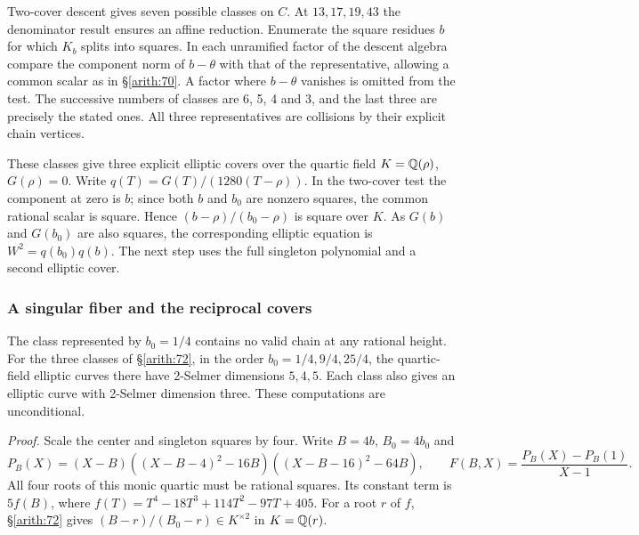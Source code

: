 Two-cover descent gives seven possible classes on \(C\). At
\(13,17,19,43\) the denominator result ensures an affine reduction.
Enumerate the square residues \(b\) for which \(K_b\) splits into
squares. In each unramified factor of the descent algebra compare
the component norm of \(b-\theta\) with that of the representative,
allowing a common scalar as in \S\ref{arith:70}. A factor where \(b-\theta\)
vanishes is omitted from the test. The successive numbers of classes
are 6, 5, 4 and 3, and the last three are precisely the stated ones.
All three representatives are collisions by their explicit chain
vertices.

These classes give three explicit elliptic covers over the quartic
field \(K=\mathbb Q(\rho)\), \(G(\rho)=0\). Write
\(q(T)=G(T)/(1280(T-\rho))\). In the two-cover test the component at
zero is \(b\); since both \(b\) and \(b_0\) are nonzero squares, the
common rational scalar is square. Hence \((b-\rho)/(b_0-\rho)\)
is square over \(K\). As \(G(b)\) and \(G(b_0)\) are also squares,
the corresponding elliptic equation is \(W^2=q(b_0)q(b)\).
The next step uses the full singleton polynomial
and a second elliptic cover.

\subsubsection{A singular fiber and the reciprocal covers}\label{arith:73}

The class represented by \(b_0=1/4\) contains no
valid chain at any rational height. For the three classes of \S\ref{arith:72},
in the order \(b_0=1/4,9/4,25/4\), the quartic-field elliptic curves
there have 2-Selmer dimensions \(5,4,5\). Each class also gives an
elliptic curve with 2-Selmer dimension three. These computations are
unconditional.

\emph{Proof.} Scale the center and singleton squares by four. Write
\(B=4b\), \(B_0=4b_0\) and
\[P_B(X)=(X-B)((X-B-4)^2-16B)((X-B-16)^2-64B),\qquad
 F(B,X)=\frac{P_B(X)-P_B(1)}{X-1}.\]
All four roots of this monic quartic must be rational squares. Its
constant term is \(5f(B)\), where
\(f(T)=T^4-18T^3+114T^2-97T+405\). For a root \(r\) of \(f\),
\S\ref{arith:72} gives \((B-r)/(B_0-r)\in K^{\times2}\) in
\(K=\mathbb Q(r)\).

